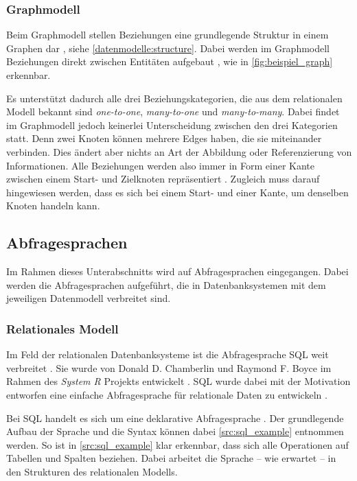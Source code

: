\subsubsection{Graphmodell}
Beim Graphmodell stellen Beziehungen eine grundlegende Struktur in einem Graphen dar \cite{gdbms}, siehe \autoref{datenmodelle:structure}. Dabei werden im Graphmodell Beziehungen direkt zwischen Entitäten aufgebaut \cite{gdbms}, wie in \autoref{fig:beispiel_graph} erkennbar. 

Es unterstützt dadurch alle drei Beziehungskategorien, die aus dem relationalen Modell bekannt sind \textit{one-to-one}, \textit{many-to-one} und \textit{many-to-many}. Dabei findet im Graphmodell jedoch keinerlei Unterscheidung zwischen den drei Kategorien statt. Denn zwei Knoten können mehrere Edges haben, die sie miteinander verbinden. Dies ändert aber nichts an Art der Abbildung oder Referenzierung von Informationen. Alle Beziehungen werden also immer in Form einer Kante zwischen einem Start- und Zielknoten repräsentiert \cite{gdbms}. Zugleich muss darauf hingewiesen werden, dass es sich bei einem Start- und einer Kante, um denselben Knoten handeln kann. 

\subsection{Abfragesprachen}
Im Rahmen dieses Unterabschnitts wird auf Abfragesprachen eingegangen. Dabei werden die Abfragesprachen aufgeführt, die in Datenbanksystemen mit dem jeweiligen Datenmodell verbreitet sind.

\subsubsection{Relationales Modell}
Im Feld der relationalen Datenbanksysteme ist die Abfragesprache SQL weit verbreitet \cite{sql_history}. Sie wurde von Donald D. Chamberlin und Raymond F. Boyce im Rahmen des \textit{System R} Projekts entwickelt \cite{sql_history}. SQL wurde dabei mit der Motivation entworfen eine einfache Abfragesprache für relationale Daten zu entwickeln \cite{sql_history}. 

Bei SQL handelt es sich um eine deklarative Abfragesprache \cite{sql_history}. Der grundlegende Aufbau der Sprache und die Syntax können dabei \autoref{src:sql_example} entnommen werden. So ist in \autoref{src:sql_example} klar erkennbar, dass sich alle Operationen auf Tabellen und Spalten beziehen. Dabei arbeitet die Sprache -- wie erwartet -- in den Strukturen des relationalen Modells.

